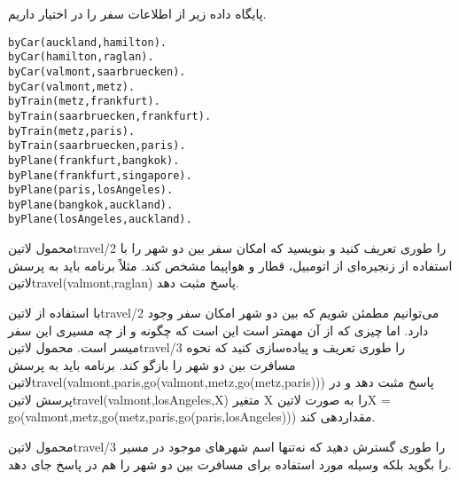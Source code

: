 \begin{enumerate}
 پایگاه داده زیر از اطلاعات سفر را در اختیار داریم.

\begin{latin}
\begin{lstlisting}
byCar(auckland,hamilton).
byCar(hamilton,raglan).
byCar(valmont,saarbruecken).
byCar(valmont,metz).
byTrain(metz,frankfurt).
byTrain(saarbruecken,frankfurt).
byTrain(metz,paris).
byTrain(saarbruecken,paris).
byPlane(frankfurt,bangkok).
byPlane(frankfurt,singapore).
byPlane(paris,losAngeles).
byPlane(bangkok,auckland).
byPlane(losAngeles,auckland).
\end{lstlisting}
\end{latin}

محمول ‌لاتین{travel/2} را طوری تعریف کنید و بنویسید که امکان سفر بین دو شهر را با استفاده از زنجیره‌ای از اتومبیل، قطار و هواپیما مشخص کند. مثلاً برنامه باید به پرسش ‌لاتین{travel(valmont,raglan)} پاسخ مثبت دهد.

 با استفاده از ‌لاتین{travel/2} می‌توانیم مطمئن شویم که بین دو شهر امکان سفر وجود دارد. اما چیزی که از آن مهمتر است این است که چگونه و از چه مسیری این سفر میسر است. محمول ‌لاتین{travel/3} را طوری تعریف و پیاده‌سازی کنید که نحوه مسافرت بین دو شهر را بازگو کند. برنامه باید به پرسش ‌لاتین{travel(valmont,paris,go(valmont,metz,go(metz,paris)))} پاسخ مثبت دهد و در پرسش ‌لاتین{travel(valmont,losAngeles,X)} متغیر X را به صورت ‌لاتین{X = go(valmont,metz,go(metz,paris,go(paris,losAngeles)))} مقداردهی کند.

  محمول ‌لاتین{travel/3} را طوری گسترش دهید که نه‌تنها اسم شهرهای موجود در مسیر را بگوید بلکه وسیله مورد استفاده برای مسافرت بین دو شهر را هم در پاسخ جای دهد.
\end{enumerate}